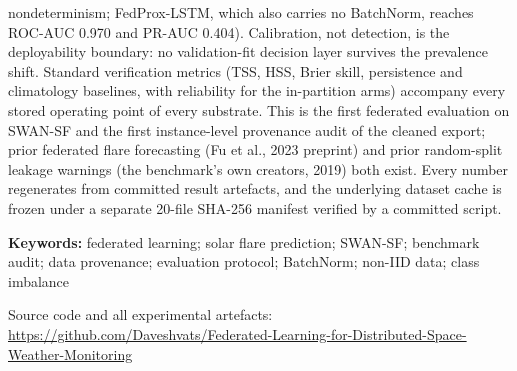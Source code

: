 \documentclass[11pt,a4paper]{article}
\begin{document}
\begin{center}
\begin{minipage}{0.92\textwidth}
nondeterminism; FedProx-LSTM, which also carries no
BatchNorm, reaches ROC-AUC 0.970 and PR-AUC 0.404). Calibration, not
detection, is
the deployability
boundary: no validation-fit decision layer survives the prevalence
shift. Standard verification metrics (TSS, HSS, Brier skill,
persistence and climatology baselines, with reliability for the
in-partition arms) accompany every stored operating point of every
substrate. This is the first federated evaluation on
SWAN-SF and the first instance-level provenance audit of the cleaned
export; prior federated flare forecasting (Fu et al., 2023 preprint)
and prior random-split leakage warnings (the benchmark's own creators,
2019) both exist. Every number regenerates from committed result
artefacts, and the underlying dataset cache is frozen under a
separate 20-file SHA-256 manifest verified by a committed script.

\vspace{0.55em}
\noindent\textbf{Keywords:} federated learning; solar flare prediction;
SWAN-SF; benchmark audit; data provenance; evaluation protocol;
BatchNorm; non-IID data; class imbalance

\vspace{0.55em}
\noindent\footnotesize Source code and all experimental artefacts:
\url{https://github.com/Daveshvats/Federated-Learning-for-Distributed-Space-Weather-Monitoring}
\end{minipage}
\end{center}

\vspace{0.8em}











\FloatBarrier
\appendix


\FloatBarrier

\end{document}
